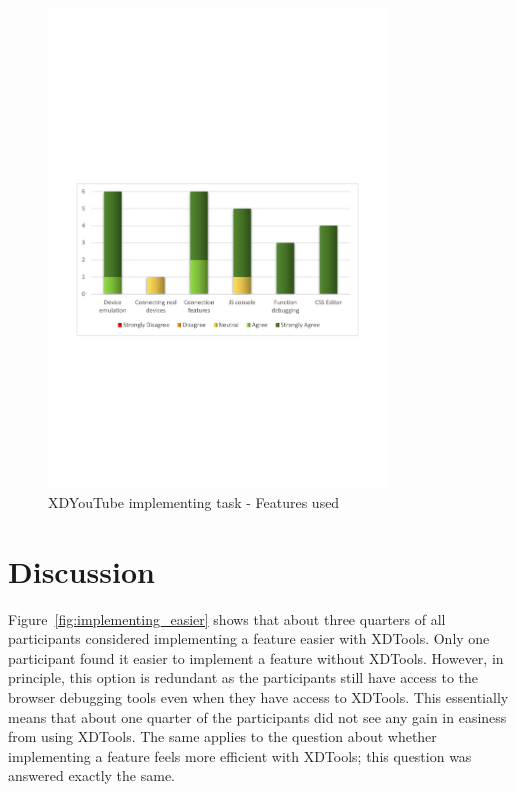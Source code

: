 \begin{figure}[H]
  \centering
    \includegraphics[width=0.8\textwidth]{images/charts/xdyt_impl_features_used.pdf}
	\caption[xdyt-impl: Features used]{XDYouTube implementing task - Features used}
	\label{fig:xdyt_impl_features_used}
\end{figure}

\section{Discussion}

Figure~\ref{fig:implementing_easier} shows that about three quarters of all participants considered implementing a feature easier with XDTools. Only one participant found it easier to implement a feature without XDTools. However, in principle, this option is redundant as the participants still have access to the browser debugging tools even when they have access to XDTools. This essentially means that about one quarter of the participants did not see any gain in easiness from using XDTools. The same applies to the question about whether implementing a feature feels more efficient with XDTools; this question was answered exactly the same.

